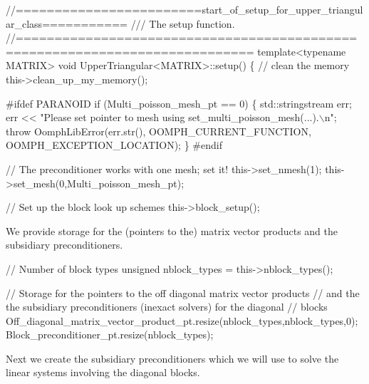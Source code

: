 \begin{DoxyCodeInclude}
 \textcolor{comment}{//========================start\_of\_setup\_for\_upper\_triangular\_class===========}\textcolor{comment}{}
\textcolor{comment}{ /// The setup function.}
\textcolor{comment}{} \textcolor{comment}{//============================================================================}
 \textcolor{keyword}{template}<\textcolor{keyword}{typename} MATRIX> 
 \textcolor{keywordtype}{void} UpperTriangular<MATRIX>::setup()
 \{
  \textcolor{comment}{// clean the memory}
  this->clean\_up\_my\_memory();

\textcolor{preprocessor}{#ifdef PARANOID}
  \textcolor{keywordflow}{if} (Multi\_poisson\_mesh\_pt == 0)
   \{
    std::stringstream err;
    err << \textcolor{stringliteral}{"Please set pointer to mesh using set\_multi\_poisson\_mesh(...).\(\backslash\)n"};
    \textcolor{keywordflow}{throw} OomphLibError(err.str(),
                        OOMPH\_CURRENT\_FUNCTION,
                        OOMPH\_EXCEPTION\_LOCATION);
   \}
\textcolor{preprocessor}{#endif }
  
  \textcolor{comment}{// The preconditioner works with one mesh; set it!}
  this->set\_nmesh(1);
  this->set\_mesh(0,Multi\_poisson\_mesh\_pt);

  \textcolor{comment}{// Set up the block look up schemes}
  this->block\_setup();

\end{DoxyCodeInclude}


We provide storage for the (pointers to the) matrix vector products and the subsidiary preconditioners.


\begin{DoxyCodeInclude}
  \textcolor{comment}{// Number of block types  }
  \textcolor{keywordtype}{unsigned} nblock\_types = this->nblock\_types();

  \textcolor{comment}{// Storage for the pointers to the off diagonal matrix vector products}
  \textcolor{comment}{// and the the subsidiary preconditioners (inexact solvers) for the diagonal }
  \textcolor{comment}{// blocks}
  Off\_diagonal\_matrix\_vector\_product\_pt.resize(nblock\_types,nblock\_types,0);
  Block\_preconditioner\_pt.resize(nblock\_types);

\end{DoxyCodeInclude}


Next we create the subsidiary preconditioners which we will use to solve the linear systems involving the diagonal blocks.


